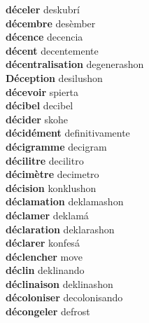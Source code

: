 \textbf{ déceler  } deskubrí \\
\textbf{ décembre  } desèmber \\
\textbf{ décence  } decencia \\
\textbf{ décent  } decentemente \\
\textbf{ décentralisation  } degenerashon \\
\textbf{ Déception  } desilushon \\
\textbf{ décevoir  } spierta \\
\textbf{ décibel  } decibel \\
\textbf{ décider  } skohe \\
\textbf{ décidément  } definitivamente \\
\textbf{ décigramme  } decigram \\
\textbf{ décilitre  } decilitro \\
\textbf{ décimètre  } decimetro \\
\textbf{ décision  } konklushon \\
\textbf{ déclamation  } deklamashon \\
\textbf{ déclamer  } deklamá \\
\textbf{ déclaration  } deklarashon \\
\textbf{ déclarer  } konfesá \\
\textbf{ déclencher  } move \\
\textbf{ déclin  } deklinando \\
\textbf{ déclinaison  } deklinashon \\
\textbf{ décoloniser  } decolonisando \\
\textbf{ décongeler  } defrost \\

